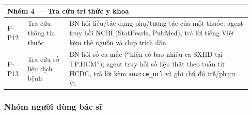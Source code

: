 \documentclass[a4paper,13pt,3p,twoside,openany]{report}
\theoremstyle{definition}
\theoremstyle{remark}
\theoremstyle{definition}
\begin{document}
\begin{table}[H]
\begin{tabular}{|l|p{4cm}|p{8cm}|}
\hline
\multicolumn{3}{|l|}{\textbf{Nhóm 4 --- Tra cứu tri thức y khoa}} \\
\hline
F-P12 & Tra cứu thông tin thuốc & BN hỏi liều/tác dụng phụ/tương tác của một thuốc; agent truy hồi NCBI (StatPearls, PubMed), trả lời tiếng Việt kèm thẻ nguồn và chip trích dẫn. \\
\hline
F-P13 & Tra cứu số liệu dịch bệnh & BN hỏi số ca mắc (``hiện có bao nhiêu ca SXHD tại TP.HCM''); agent truy hồi số liệu thật theo tuần từ HCDC, trả lời kèm \texttt{source\_url} và ghi chú độ trễ/phạm vi. \\
\hline
\end{tabular}
\end{table}

\subsubsection{Nhóm người dùng bác sĩ}
\end{document}
